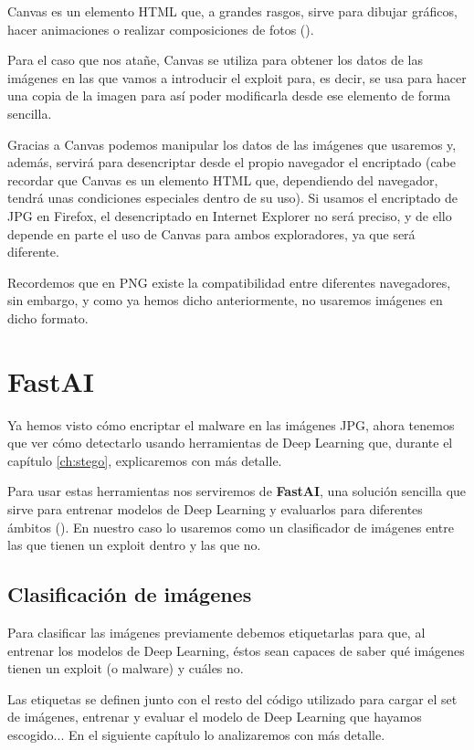 Canvas es un elemento HTML que, a grandes rasgos, sirve para dibujar gráficos, hacer animaciones o realizar composiciones de fotos (\cite{canvas}).

Para el caso que nos atañe, Canvas se utiliza para obtener los datos de las imágenes en las que vamos a introducir el exploit para, es decir, se usa para hacer una copia de la imagen para así poder modificarla desde ese elemento de forma sencilla.

Gracias a Canvas podemos manipular los datos de las imágenes que usaremos y, además, servirá para desencriptar desde el propio navegador el encriptado (cabe recordar que Canvas es un elemento HTML que, dependiendo del navegador, tendrá unas condiciones especiales dentro de su uso). Si usamos el encriptado de JPG en Firefox, el desencriptado en Internet Explorer no será preciso, y de ello depende en parte el uso de Canvas para ambos exploradores, ya que será diferente.

Recordemos que en PNG existe la compatibilidad entre diferentes navegadores, sin embargo, y como ya hemos dicho anteriormente, no usaremos imágenes en dicho formato.

\section{FastAI}

Ya hemos visto cómo encriptar el malware en las imágenes JPG, ahora tenemos que ver cómo detectarlo usando herramientas de Deep Learning que, durante el capítulo \ref{ch:stego}, explicaremos con más detalle.

Para usar estas herramientas nos serviremos de \textbf{FastAI}, una solución sencilla que sirve para entrenar modelos de Deep Learning y evaluarlos para diferentes ámbitos (\cite{fastai}). En nuestro caso lo usaremos como un clasificador de imágenes entre las que tienen un exploit dentro y las que no. %

\subsection{Clasificación de imágenes}

Para clasificar las imágenes previamente debemos etiquetarlas para que, al entrenar los modelos de Deep Learning, éstos sean capaces de saber qué imágenes tienen un exploit (o malware) y cuáles no.

Las etiquetas se definen junto con el resto del código utilizado para cargar el set de imágenes, entrenar y evaluar el modelo de Deep Learning que hayamos escogido... En el siguiente capítulo lo analizaremos con más detalle.

